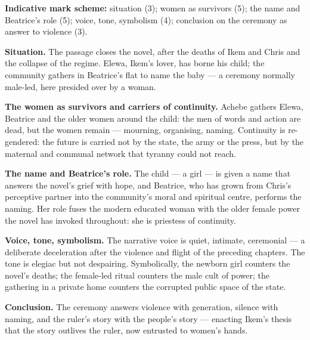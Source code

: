 \documentclass[11pt]{article}
\begin{document}
\begin{corrige}
\textbf{Indicative mark scheme:} situation (3); women as survivors (5); the name and Beatrice's role (5); voice, tone, symbolism (4); conclusion on the ceremony as answer to violence (3).

\textbf{Situation.} The passage closes the novel, after the deaths of Ikem and Chris and the collapse of the regime. Elewa, Ikem's lover, has borne his child; the community gathers in Beatrice's flat to name the baby --- a ceremony normally male-led, here presided over by a woman.

\textbf{The women as survivors and carriers of continuity.} Achebe gathers Elewa, Beatrice and the older women around the child: the men of words and action are dead, but the women remain --- mourning, organising, naming. Continuity is re-gendered: the future is carried not by the state, the army or the press, but by the maternal and communal network that tyranny could not reach.

\textbf{The name and Beatrice's role.} The child --- a girl --- is given a name that answers the novel's grief with hope, and Beatrice, who has grown from Chris's perceptive partner into the community's moral and spiritual centre, performs the naming. Her role fuses the modern educated woman with the older female power the novel has invoked throughout: she is priestess of continuity.

\textbf{Voice, tone, symbolism.} The narrative voice is quiet, intimate, ceremonial --- a deliberate deceleration after the violence and flight of the preceding chapters. The tone is elegiac but not despairing. Symbolically, the newborn girl counters the novel's deaths; the female-led ritual counters the male cult of power; the gathering in a private home counters the corrupted public space of the state.

\textbf{Conclusion.} The ceremony answers violence with generation, silence with naming, and the ruler's story with the people's story --- enacting Ikem's thesis that the story outlives the ruler, now entrusted to women's hands.
\end{corrige}
\end{document}
